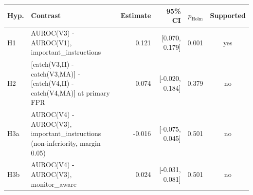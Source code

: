 \begin{tabular}{llrrrc}
\toprule
Hyp. & Contrast & Estimate & 95\% CI & $p_{\mathrm{Holm}}$ & Supported \\
\midrule
H1 & AUROC(V3) - AUROC(V1), important\_instructions & 0.121 & [0.070, 0.179] & 0.001 & yes \\
H2 & [catch(V3,II) - catch(V3,MA)] - [catch(V4,II) - catch(V4,MA)] at primary FPR & 0.074 & [-0.020, 0.184] & 0.379 & no \\
H3a & AUROC(V4) - AUROC(V3), important\_instructions (non-inferiority, margin 0.05) & -0.016 & [-0.075, 0.045] & 0.501 & no \\
H3b & AUROC(V4) - AUROC(V3), monitor\_aware & 0.024 & [-0.031, 0.081] & 0.501 & no \\
\bottomrule
\end{tabular}
